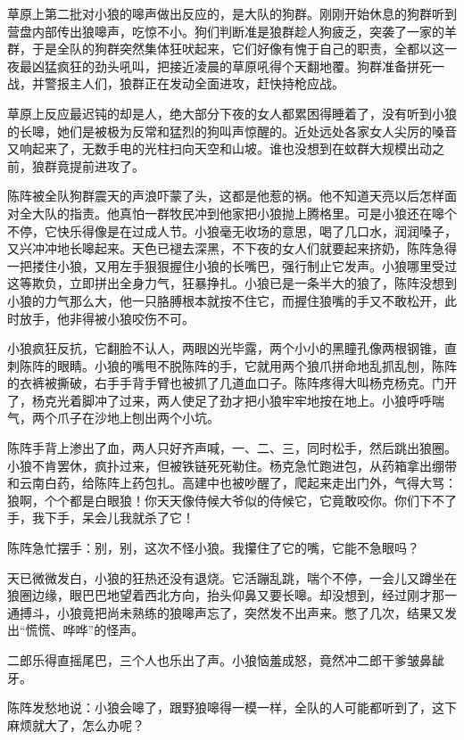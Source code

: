 \par 草原上第二批对小狼的嗥声做出反应的，是大队的狗群。刚刚开始休息的狗群听到营盘内部传出狼嗥声，吃惊不小。狗们判断准是狼群趁人狗疲乏，突袭了一家的羊群，于是全队的狗群突然集体狂吠起来，它们好像有愧于自己的职责，全都以这一夜最凶猛疯狂的劲头吼叫，把接近凌晨的草原吼得个天翻地覆。狗群准备拼死一战，并警报主人们，狼群正在发动全面进攻，赶快持枪应战。
\par 草原上反应最迟钝的却是人，绝大部分下夜的女人都累困得睡着了，没有听到小狼的长嗥，她们是被极为反常和猛烈的狗叫声惊醒的。近处远处各家女人尖厉的嗓音又响起来了，无数手电的光柱扫向天空和山坡。谁也没想到在蚊群大规模出动之前，狼群竟提前进攻了。
\par 陈阵被全队狗群震天的声浪吓蒙了头，这都是他惹的祸。他不知道天亮以后怎样面对全大队的指责。他真怕一群牧民冲到他家把小狼抛上腾格里。可是小狼还在嗥个不停，它快乐得像是在过成人节。小狼毫无收场的意思，喝了几口水，润润嗓子，又兴冲冲地长嗥起来。天色已褪去深黑，不下夜的女人们就要起来挤奶，陈阵急得一把搂住小狼，又用左手狠狠握住小狼的长嘴巴，强行制止它发声。小狼哪里受过这等欺负，立即拼出全身力气，狂暴挣扎。小狼已是一条半大的狼了，陈阵没想到小狼的力气那么大，他一只胳膊根本就按不住它，而握住狼嘴的手又不敢松开，此时放手，他非得被小狼咬伤不可。
\par 小狼疯狂反抗，它翻脸不认人，两眼凶光毕露，两个小小的黑瞳孔像两根钢锥，直刺陈阵的眼睛。小狼的嘴甩不脱陈阵的手，它就用两个狼爪拼命地乱抓乱刨，陈阵的衣裤被撕破，右手手背手臂也被抓了几道血口子。陈阵疼得大叫杨克杨克。门开了，杨克光着脚冲了过来，两人使足了劲才把小狼牢牢地按在地上。小狼呼呼喘气，两个爪子在沙地上刨出两个小坑。
\par 陈阵手背上渗出了血，两人只好齐声喊，一、二、三，同时松手，然后跳出狼圈。小狼不肯罢休，疯扑过来，但被铁链死死勒住。杨克急忙跑进包，从药箱拿出绷带和云南白药，给陈阵上药包扎。高建中也被吵醒了，爬起来走出门外，气得大骂：狼啊，个个都是白眼狼！你天天像侍候大爷似的侍候它，它竟敢咬你。你们下不了手，我下手，呆会儿我就杀了它！
\par 陈阵急忙摆手：别，别，这次不怪小狼。我攥住了它的嘴，它能不急眼吗？
\par 天已微微发白，小狼的狂热还没有退烧。它活蹦乱跳，喘个不停，一会儿又蹲坐在狼圈边缘，眼巴巴地望着西北方向，抬头仰鼻又要长嗥。却没想到，经过刚才那一通搏斗，小狼竟把尚未熟练的狼嗥声忘了，突然发不出声来。憋了几次，结果又发出“慌慌、哗哗”的怪声。
\par 二郎乐得直摇尾巴，三个人也乐出了声。小狼恼羞成怒，竟然冲二郎干爹皱鼻龇牙。
\par 陈阵发愁地说：小狼会嗥了，跟野狼嗥得一模一样，全队的人可能都听到了，这下麻烦就大了，怎么办呢？
